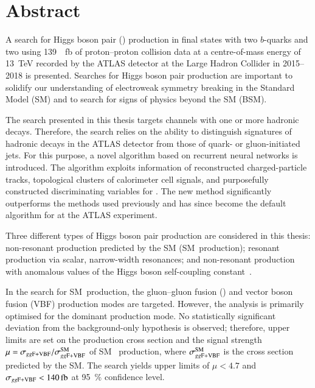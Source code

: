 \chapter*{Abstract}

A search for Higgs boson pair (\HH) production in final states with two
$b$-quarks and two \tauleptons using \SI{139}{\per\femto\barn} of proton--proton
collision data at a centre-of-mass energy of \SI{13}{\TeV} recorded by the ATLAS
detector at the Large Hadron Collider in 2015--2018 is presented. Searches for
Higgs boson pair production are important to solidify our understanding of
electroweak symmetry breaking in the Standard Model (SM) and to search for signs
of physics beyond the SM (BSM).

The search presented in this thesis targets channels with one or more hadronic
\taulepton decays. Therefore, the search relies on the ability to distinguish
signatures of hadronic \taulepton decays in the ATLAS detector from those of
quark- or gluon-initiated jets. For this purpose, a novel \tauid algorithm based
on recurrent neural networks is introduced. The algorithm exploits information
of reconstructed charged-particle tracks, topological clusters of calorimeter
cell signals, and purposefully constructed discriminating variables for
\tauid. The new \tauid method significantly outperforms the methods used
previously and has since become the default algorithm for \tauid at the ATLAS
experiment.

Three different types of Higgs boson pair production are considered in this
thesis: non-resonant \HH production predicted by the SM (SM~\HH production);
resonant \HH production via scalar, narrow-width resonances; and non-resonant
\HH production with anomalous values of the Higgs boson self-coupling
constant~\lambdahhh.

In the search for SM~\HH production, the gluon--gluon fusion (\ggF) and vector
boson fusion (VBF) production modes are targeted. However, the analysis is
primarily optimised for the dominant \ggF production mode. No statistically
significant deviation from the background-only hypothesis is observed;
therefore, upper limits are set on the production cross section \xsecggfvbf and
the signal strength~$\mu = \sigma_{gg\text{F+VBF}} / \sigma_{gg\text{F+VBF}}^{\text{SM}}$ of SM~\HH
production, where $\sigma_{gg\text{F+VBF}}^{\text{SM}}$ is the cross section predicted by
the SM. The search yields upper limits of $\mu < \num{4.7}$ and
$\xsecggfvbf < \SI{140}{\femto\barn}$ at \SI{95}{\percent} confidence level.

